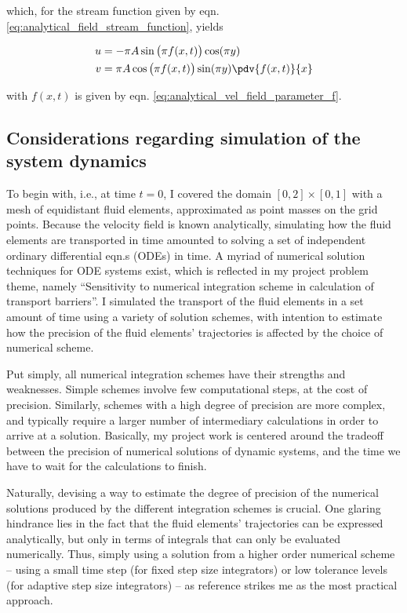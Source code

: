 which, for the stream function given by eqn.
\eqref{eq:analytical_field_stream_function}, yields

\begin{subequations}
  \begin{align}
    u &= - \pi{}A\sin\big(\pi{}f(x,t)\big)\cos(\pi{}y) \\
    v &= \pi{}A\cos\big(\pi{}f(x,t)\big)\sin(\pi{}y)\pdv{f(x,t)}{x}
  \end{align}
\end{subequations}

with $f(x,t)$ is given by eqn. 
\eqref{eq:analytical_vel_field_parameter_f}.

\subsection{Considerations regarding simulation of
                    the system dynamics}
\label{sec:initial_simulation_considerations}
To begin with, i.e., at time $t=0$, I covered the domain
$[0,2]\times[0,1]$ with a mesh of equidistant fluid elements,
approximated as point masses on the grid points. Because the velocity
field is known analytically, simulating how the fluid elements are
transported in time amounted to solving a set of independent ordinary
differential eqn.s (ODEs) in time. A myriad of numerical solution
techniques for ODE systems exist, which is reflected in my project
problem theme, namely ``Sensitivity to numerical integration scheme in
calculation of transport barriers''. I simulated the transport of the
fluid elements in a set amount of time using a variety of solution
schemes, with intention to estimate how the precision of the fluid
elements' trajectories is affected by the choice of numerical scheme.

Put simply, all numerical integration schemes have their strengths
and weaknesses. Simple schemes involve few computational steps,
at the cost of precision. Similarly, schemes with a high degree of
precision are more complex, and typically require a larger number
of intermediary calculations in order to arrive at a solution.
Basically, my project work is centered around the tradeoff between
the precision of numerical solutions of dynamic systems, and the
time we have to wait for the calculations to finish.

Naturally, devising a way to estimate the degree of precision of the
numerical solutions produced by the different integration schemes is
crucial. One glaring hindrance lies in the fact that the fluid
elements' trajectories can be expressed analytically, but only in
terms of integrals that can only be evaluated numerically. Thus,
simply using a solution from a higher order numerical scheme -- using
a small time step (for fixed step size integrators) or low tolerance
levels (for adaptive step size integrators) -- as reference strikes
me as the most practical approach.

